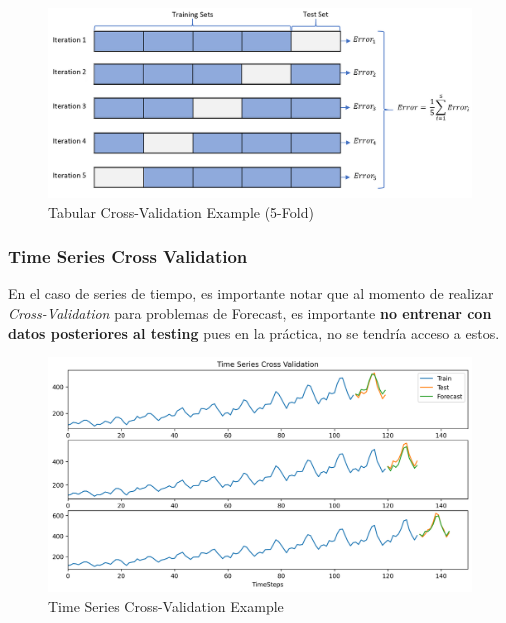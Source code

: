 \begin{figure}[H]
    \center
    \includegraphics[scale=0.3]{notebooks/Others/img/tabular_cross_validation.png}
    \caption{Tabular Cross-Validation Example (5-Fold)}
\end{figure}

\subsubsection{Time Series Cross Validation}

En el caso de series de tiempo, es importante notar que al momento de realizar \textit{Cross-Validation} para problemas de Forecast, es importante \textbf{no entrenar con datos posteriores al testing} pues en la práctica, no se tendría acceso a estos.

\begin{figure}[H]
    \center
    \includegraphics[scale=0.45]{notebooks/Others/img/time_series_cross_validation.png}
    \caption{Time Series Cross-Validation Example}
\end{figure}








